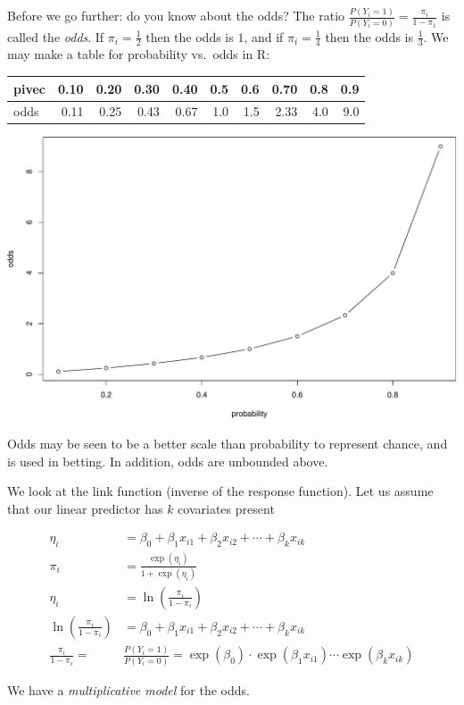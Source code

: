 \documentclass[
  ignorenonframetext,
]{beamer}
\begin{document}
\begin{frame}
Before we go further: do you know about the odds? The ratio
\(\frac{P(Y_i=1)}{P(Y_i=0)}=\frac{\pi_i}{1-\pi_1}\) is called the
\emph{odds}. If \(\pi_i=\frac{1}{2}\) then the odds is \(1\), and if
\(\pi_i=\frac{1}{4}\) then the odds is \(\frac{1}{3}\). We may make a
table for probability vs.~odds in R:

\begin{table}
\centering
\begin{tabular}{l|r|r|r|r|r|r|r|r|r}
\hline
pivec & 0.10 & 0.20 & 0.30 & 0.40 & 0.5 & 0.6 & 0.70 & 0.8 & 0.9\\
\hline
odds & 0.11 & 0.25 & 0.43 & 0.67 & 1.0 & 1.5 & 2.33 & 4.0 & 9.0\\
\hline
\end{tabular}
\end{table}
\end{frame}

\begin{frame}
\includegraphics{Module03PresentationWeek1_files/figure-beamer/unnamed-chunk-7-1.pdf}

Odds may be seen to be a better scale than probability to represent
chance, and is used in betting. In addition, odds are unbounded above.
\end{frame}

\begin{frame}
We look at the link function (inverse of the response function). Let us
assume that our linear predictor has \(k\) covariates present

\begin{align*}
\eta_i&= \beta_0+\beta_1 x_{i1}+\beta_2 x_{i2}+\cdots + \beta_k x_{ik}\\
\pi_i&= \frac{\exp(\eta_i)}{1+\exp(\eta_i)}\\
\eta_i&=\ln(\frac{\pi_i}{1-\pi_i})\\
\ln(\frac{\pi_i}{1-\pi_i})&=\beta_0+\beta_1 x_{i1}+\beta_2 x_{i2}+\cdots + \beta_k x_{ik}\\
\frac{\pi_i}{1-\pi_i}=&\frac{P(Y_i=1)}{P(Y_i=0)}=\exp(\beta_0)\cdot \exp(\beta_1 x_{i1})\cdots\exp(\beta_k x_{ik})
\end{align*}

We have a \emph{multiplicative model} for the odds.
\end{frame}
\end{document}
